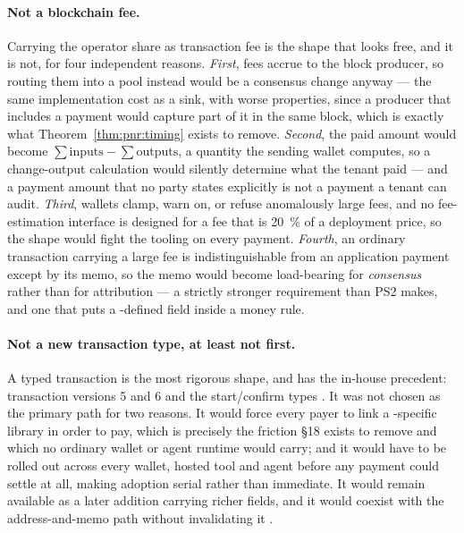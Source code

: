 \paragraph{Not a blockchain fee.} Carrying the operator share as transaction fee is the shape that
looks free, and it is not, for four independent reasons. \emph{First}, fees accrue to the block
producer, so routing them into a pool instead would be a consensus change anyway --- the same
implementation cost as a sink, with worse properties, since a producer that includes a payment would
capture part of it in the same block, which is exactly what Theorem~\ref{thm:pnr:timing} exists to
remove. \emph{Second}, the paid amount would become
$\sum\text{inputs} - \sum\text{outputs}$, a quantity the sending wallet computes, so a change-output
calculation would silently determine what the tenant paid --- and a payment amount that no party
states explicitly is not a payment a tenant can audit. \emph{Third}, wallets clamp, warn on, or
refuse anomalously large fees, and no fee-estimation interface is designed for a fee that is
\SI{20}{\percent} of a deployment price, so the shape would fight the tooling on every payment.
\emph{Fourth}, an ordinary transaction carrying a large fee is indistinguishable from an application
payment except by its memo, so the memo would become load-bearing for \emph{consensus} rather than
for attribution --- a strictly stronger requirement than PS2 makes, and one that puts a
\FluxOS-defined field inside a money rule.

\paragraph{Not a new transaction type, at least not first.} A typed transaction is the most rigorous
shape, and \Flux has the in-house precedent: transaction versions 5 and 6 and the \FluxNode
start/confirm types \shipped {}. It was not
chosen as the primary path for two reasons. It would force every payer to link a \Flux-specific
library in order to pay, which is precisely the friction \S18 exists to remove and which no ordinary
wallet or agent runtime would carry; and it would have to be rolled out across every wallet, hosted
tool and agent before any payment could settle at all, making adoption serial rather than immediate.
It would remain available as a later addition carrying richer fields, and it would coexist with the
address-and-memo path without invalidating it \planned {}.

